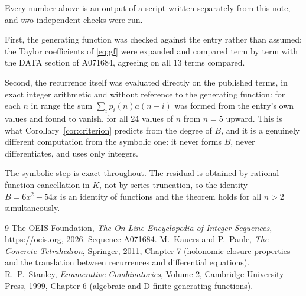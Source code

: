 \documentclass[11pt,a4paper]{article}
\theoremstyle{plain}
\theoremstyle{definition}
\begin{document}
Every number above is an output of a script written separately from this note, and two
independent checks were run.

First, the generating function was checked against the entry rather than assumed: the
Taylor coefficients of \eqref{eq:gf} were expanded and compared term by term with the DATA
section of A071684, agreeing on all 13 terms compared.

Second, the recurrence itself was evaluated directly on the published terms, in exact
integer arithmetic and without reference to the generating function: for each $n$ in range
the sum $\sum_{i}p_{i}(n)a(n-i)$ was formed from the entry's own values and found to
vanish, for all 24 values of $n$ from $n=5$ upward. This is what
Corollary~\ref{cor:criterion} predicts from the degree of $B$, and it is a genuinely
different computation from the symbolic one: it never forms $B$, never differentiates, and
uses only integers.

The symbolic step is exact throughout. The residual is obtained by rational-function
cancellation in $K$, not by series truncation, so the identity $B=6 x^{2} - 54 x$ is an
identity of functions and the theorem holds for all $n>2$ simultaneously.

\begin{thebibliography}{9}
 The OEIS Foundation, \emph{The On-Line Encyclopedia of Integer Sequences},
\url{https://oeis.org}, 2026. Sequence A071684.
 M.~Kauers and P.~Paule, \emph{The Concrete Tetrahedron}, Springer, 2011,
Chapter 7 (holonomic closure properties and the translation between recurrences and
differential equations).
 R.~P.~Stanley, \emph{Enumerative Combinatorics}, Volume 2, Cambridge
University Press, 1999, Chapter 6 (algebraic and D-finite generating functions).
\end{thebibliography}
\end{document}
